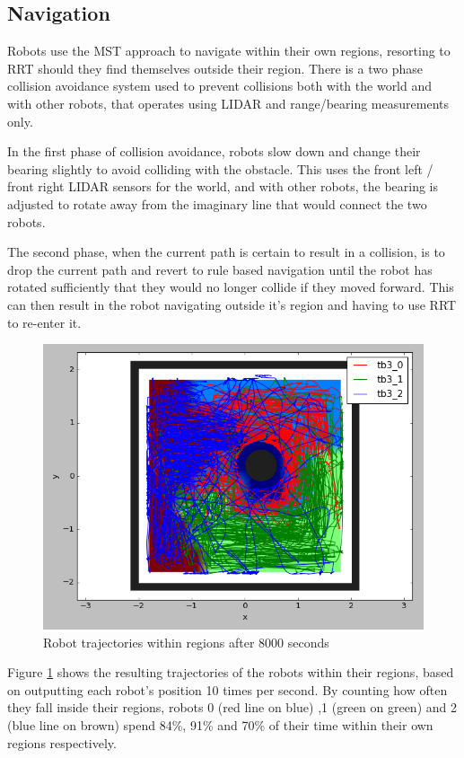 \documentclass[10pt,a4paper]{article}
\begin{document}
\subsection{Navigation}
Robots use the MST approach to navigate within their own regions, resorting to RRT should they find themselves outside their region. There is a two phase collision avoidance system used to prevent collisions both with the world and with other robots, that operates using LIDAR and range/bearing measurements only.

In the first phase of collision avoidance, robots slow down and change their bearing slightly to avoid colliding with the obstacle. This uses the front left / front right LIDAR sensors for the world, and with other robots, the bearing is adjusted to rotate away from the imaginary line that would connect the two robots.

The second phase, when the current path is certain to result in a collision, is to drop the current path and revert to rule based navigation until the robot has rotated sufficiently that they would no longer collide if they moved forward. This can then result in the robot navigating outside it's region and having to use RRT to re-enter it.

\begin{figure}
	\includegraphics[width=\columnwidth]{dec_t2_cover.png}
	\caption{Robot trajectories within regions after 8000 seconds}
    \label{fig:decCover}
\end{figure}




Figure \ref{fig:decCover} shows the resulting trajectories of the robots within their regions, based on outputting each robot's position 10 times per second. By counting how often they fall inside their regions, robots 0 (red line on blue) ,1 (green on green) and 2 (blue line on brown) spend 84\%, 91\% and 70\% of their time within their own regions respectively.
\end{document}
